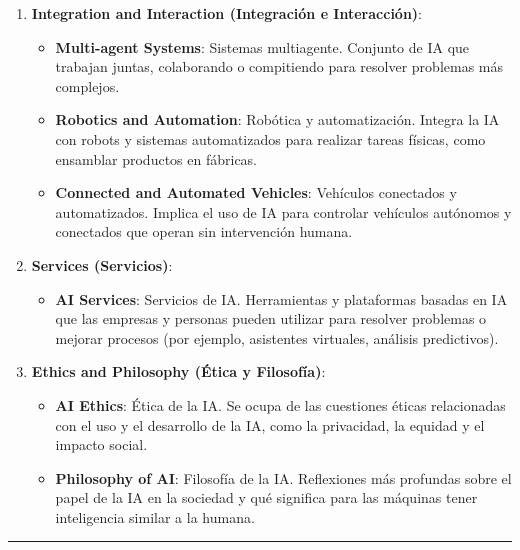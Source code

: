 \documentclass[
  10pt,
  letterpaper,
]{book}
\providecommand{\tightlist}{%
  \setlength{\itemsep}{0pt}\setlength{\parskip}{0pt}}\usepackage{longtable,booktabs,array}
\begin{document}
\begin{enumerate}
\def\labelenumi{\arabic{enumi}.}
\tightlist
\item
  \textbf{Integration and Interaction (Integración e Interacción)}:

  \begin{itemize}
  \tightlist
  \item
    \textbf{Multi-agent Systems}: Sistemas multiagente. Conjunto de IA
    que trabajan juntas, colaborando o compitiendo para resolver
    problemas más complejos.
  \item
    \textbf{Robotics and Automation}: Robótica y automatización. Integra
    la IA con robots y sistemas automatizados para realizar tareas
    físicas, como ensamblar productos en fábricas.
  \item
    \textbf{Connected and Automated Vehicles}: Vehículos conectados y
    automatizados. Implica el uso de IA para controlar vehículos
    autónomos y conectados que operan sin intervención humana.
  \end{itemize}
\item
  \textbf{Services (Servicios)}:

  \begin{itemize}
  \tightlist
  \item
    \textbf{AI Services}: Servicios de IA. Herramientas y plataformas
    basadas en IA que las empresas y personas pueden utilizar para
    resolver problemas o mejorar procesos (por ejemplo, asistentes
    virtuales, análisis predictivos).
  \end{itemize}
\item
  \textbf{Ethics and Philosophy (Ética y Filosofía)}:

  \begin{itemize}
  \tightlist
  \item
    \textbf{AI Ethics}: Ética de la IA. Se ocupa de las cuestiones
    éticas relacionadas con el uso y el desarrollo de la IA, como la
    privacidad, la equidad y el impacto social.
  \item
    \textbf{Philosophy of AI}: Filosofía de la IA. Reflexiones más
    profundas sobre el papel de la IA en la sociedad y qué significa
    para las máquinas tener inteligencia similar a la humana.
  \end{itemize}
\end{enumerate}

\begin{center}\rule{0.5\linewidth}{0.5pt}\end{center}
\end{document}

